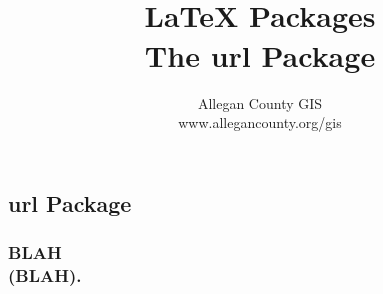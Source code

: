 \documentclass[class=report , crop=false, multi={itemize, figure}, float=false]{standalone}
\title{ %
\HRule %
\\[.4cm] %
	\Huge \bfseries \LaTeX{} Packages\\ \medskip\large The url Package %
\HRule \\[.4cm] %
}  %
\author{\Large Allegan County GIS \\\Large www.allegancounty.org/gis} %
\begin{document}

\ifstandalone
\maketitle %
\tableofcontents %
\clearpage
\fi

	
\subsection{url Package}
	\medskip 
	\subsubsection{\Large BLAH \\\small(BLAH).}
	

	
\end{document}
